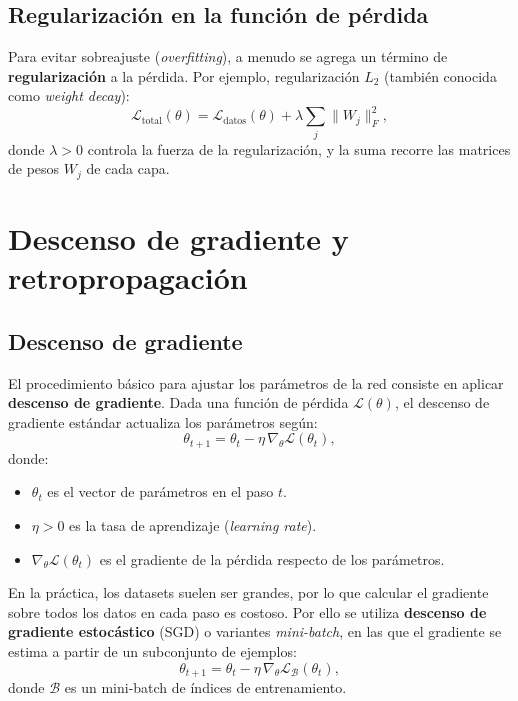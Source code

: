 \subsection{Regularización en la función de pérdida}

Para evitar sobreajuste (\textit{overfitting}), a menudo se agrega un término de \textbf{regularización} a la pérdida. Por ejemplo, regularización $L_2$ (también conocida como \textit{weight decay}):
\begin{equation}
    \mathcal{L}_{\text{total}}(\theta)
    = \mathcal{L}_{\text{datos}}(\theta)
    + \lambda \sum_{j} \|W_j\|_F^2,
\end{equation}
donde $\lambda > 0$ controla la fuerza de la regularización, y la suma recorre las matrices de pesos $W_j$ de cada capa.

\section{Descenso de gradiente y retropropagación}

\subsection{Descenso de gradiente}

El procedimiento básico para ajustar los parámetros de la red consiste en aplicar \textbf{descenso de gradiente}. Dada una función de pérdida $\mathcal{L}(\theta)$, el descenso de gradiente estándar actualiza los parámetros según:
\begin{equation}
    \theta_{t+1} = \theta_t - \eta \, \nabla_{\theta} \mathcal{L}(\theta_t),
\end{equation}
donde:
\begin{itemize}
    \item $\theta_t$ es el vector de parámetros en el paso $t$.
    \item $\eta > 0$ es la tasa de aprendizaje (\textit{learning rate}).
    \item $\nabla_{\theta} \mathcal{L}(\theta_t)$ es el gradiente de la pérdida respecto de los parámetros.
\end{itemize}

En la práctica, los datasets suelen ser grandes, por lo que calcular el gradiente sobre todos los datos en cada paso es costoso. Por ello se utiliza \textbf{descenso de gradiente estocástico} (SGD) o variantes \textit{mini-batch}, en las que el gradiente se estima a partir de un subconjunto de ejemplos:
\begin{equation}
    \theta_{t+1} = \theta_t - \eta \, \nabla_{\theta} \mathcal{L}_\mathcal{B}(\theta_t),
\end{equation}
donde $\mathcal{B}$ es un mini-batch de índices de entrenamiento.

